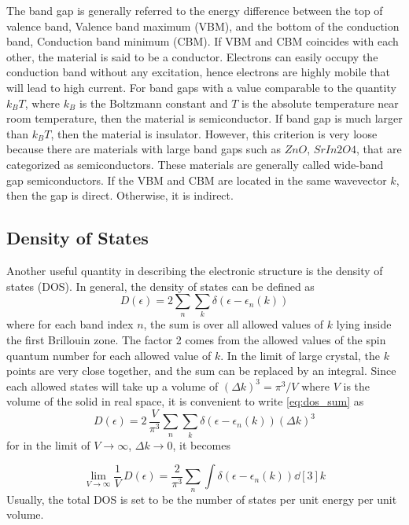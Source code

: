 The band gap is generally referred to the energy difference between the top of valence band, Valence band maximum (VBM),  and the bottom of the conduction band, Conduction band minimum (CBM). If VBM and CBM coincides with each other, the material is said to be a conductor. Electrons can easily occupy the conduction band without any excitation, hence electrons are highly mobile that will lead to high current. For band gaps with a value comparable to the quantity $k_B T$, where $k_B$ is the Boltzmann constant and  $T$ is the absolute temperature near room temperature, then the material is semiconductor. If band gap is much larger than $k_B T$, then the material is insulator. However, this criterion is very loose because there are materials with large band gaps such as $ZnO$, $SrIn2O4$, that are categorized as semiconductors. These materials are generally called wide-band gap semiconductors. If the VBM and CBM are located in the same wavevector $k$, then the gap is direct. Otherwise, it is indirect. 

    \subsection{Density of States}
    Another useful quantity in describing the electronic structure is the density of states (DOS). In general, the density of states can be defined as \citep{Ashcroft1976}
    \begin{equation} \label{eq:dos_sum}
        D(\epsilon) = 2 \sum_n \sum_k \delta(\epsilon - \epsilon_n(k))
    \end{equation}
    where for each band index $n$, the sum is over all allowed values of $k$ lying inside the first Brillouin zone. The factor 2 comes from the allowed values of the spin quantum number for each allowed value of $k$. In the limit of large crystal, the $k$ points are very close together, and the sum can be replaced by an integral. Since each allowed states will take up a volume of $ (\Delta k)^3 = \pi^3/V$ where $V$ is the volume of the solid in real space, it is convenient to write \eqref{eq:dos_sum} as 
    \begin{equation} \label{eq:dos_int}
        D(\epsilon) = 2\, \frac{V}{\pi^3} \sum_n \sum_k \delta(\epsilon - \epsilon_n(k)) (\Delta k)^3
    \end{equation}
    for  in the limit of $V \rightarrow \infty $, $\Delta k \rightarrow 0$, it becomes

    \begin{equation}
        \lim_{V \to \infty} \frac{1}{V}\, D(\epsilon) = \frac{2}{\pi^3} \sum_n \int \delta(\epsilon - \epsilon_n(k)) \dd[3]{k}
    \end{equation}  
    Usually, the total DOS is set to be the number of states per unit energy per unit volume. 

